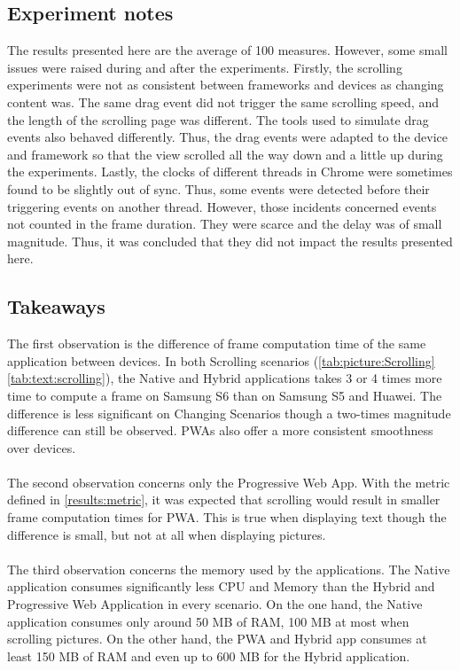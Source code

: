 \subsection{Experiment notes}
The results presented here are the average of 100 measures. However, some small issues were raised during and after the experiments.\newline
Firstly, the scrolling experiments were not as consistent between frameworks and devices as changing content was. The same drag event did not trigger the same scrolling speed, and the length of the scrolling page was different. The tools used to simulate drag events also behaved  differently. Thus, the drag events were adapted to the device and framework so that the view scrolled all the way down and a little up during the experiments. \newline
Lastly, the clocks of different threads in Chrome were sometimes found to be slightly out of sync. Thus, some events were detected before their triggering events on another thread. However, those incidents concerned events not counted in the frame duration. They were scarce and the delay was of small magnitude. Thus, it was concluded that they did not impact the results presented here.

\subsection{Takeaways}
\label{results:performance}
The first observation is the difference of frame computation time of the same application between devices. In both Scrolling scenarios (\autoref{tab:picture:Scrolling} \autoref{tab:text:scrolling}), the Native and Hybrid applications takes 3 or 4 times more time to compute a frame on Samsung S6 than on Samsung S5 and Huawei. The difference is less significant on Changing Scenarios though a two-times magnitude difference can still be observed. PWAs also offer a more consistent smoothness over devices.
\paragraph{}
The second observation concerns only the Progressive Web App. With the metric defined in \autoref{results:metric}, it was expected that scrolling would result in smaller frame computation times for PWA. This is true when displaying text though the difference is small, but not at all when displaying pictures. 

\paragraph{}
The third observation concerns the memory used by the applications. The Native application consumes significantly less CPU and Memory than the Hybrid and Progressive Web Application in every scenario. On the one hand, the Native application consumes only around 50 MB of RAM, 100 MB at most when scrolling pictures. On the other hand, the PWA and Hybrid app consumes at least 150 MB of RAM and even up to 600 MB for the Hybrid application.

